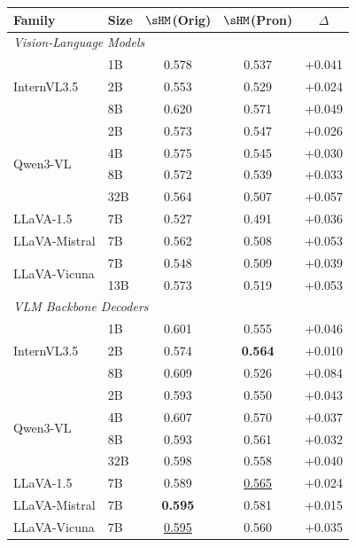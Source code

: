 \begin{table}[h]
\centering
% 
\setlength{\tabcolsep}{3.5pt}
\renewcommand{\arraystretch}{1.05}

\begin{tabular}{llccc}
\toprule
\textbf{Family} & \textbf{Size} & $\sHM$(Orig) & $\sHM$(Pron) & $\Delta$ \\
\midrule
\multicolumn{5}{l}{\textit{Vision-Language Models}} \\
\midrule
\multirow{3}{*}{InternVL3.5} & 1B & 0.578 & 0.537 & +0.041 \\
 & 2B & 0.553 & 0.529 & +0.024 \\
 & 8B & 0.620 & 0.571 & +0.049 \\
\midrule
\multirow{4}{*}{Qwen3-VL} & 2B & 0.573 & 0.547 & +0.026 \\
 & 4B & 0.575 & 0.545 & +0.030 \\
 & 8B & 0.572 & 0.539 & +0.033 \\
 & 32B & 0.564 & 0.507 & +0.057 \\
\midrule
\multirow{1}{*}{LLaVA-1.5} & 7B & 0.527 & 0.491 & +0.036 \\
\midrule
\multirow{1}{*}{LLaVA-Mistral} & 7B & 0.562 & 0.508 & +0.053 \\
\midrule
\multirow{2}{*}{LLaVA-Vicuna} & 7B & 0.548 & 0.509 & +0.039 \\
 & 13B & 0.573 & 0.519 & +0.053 \\
\midrule
\multicolumn{5}{l}{\textit{VLM Backbone Decoders}} \\
\midrule
\multirow{3}{*}{InternVL3.5} & 1B & 0.601 & 0.555 & +0.046 \\
 & 2B & 0.574 & \cellcolor{green!20}\textbf{0.564} & +0.010 \\
 & 8B & 0.609 & 0.526 & +0.084 \\
\midrule
\multirow{4}{*}{Qwen3-VL} & 2B & 0.593 & 0.550 & +0.043 \\
 & 4B & 0.607 & 0.570 & +0.037 \\
 & 8B & 0.593 & 0.561 & +0.032 \\
 & 32B & \cellcolor{green!20}0.598 & 0.558 & +0.040 \\
\midrule
\multirow{1}{*}{LLaVA-1.5} & 7B & 0.589 & \cellcolor{green!20}\underline{0.565} & +0.024 \\
\midrule
\multirow{1}{*}{LLaVA-Mistral} & 7B & \cellcolor{green!20}\textbf{0.595} & 0.581 & +0.015 \\
\midrule
\multirow{1}{*}{LLaVA-Vicuna} & 7B & \cellcolor{green!20}\underline{0.595} & 0.560 & +0.035 \\

\end{tabular}
\end{table}
